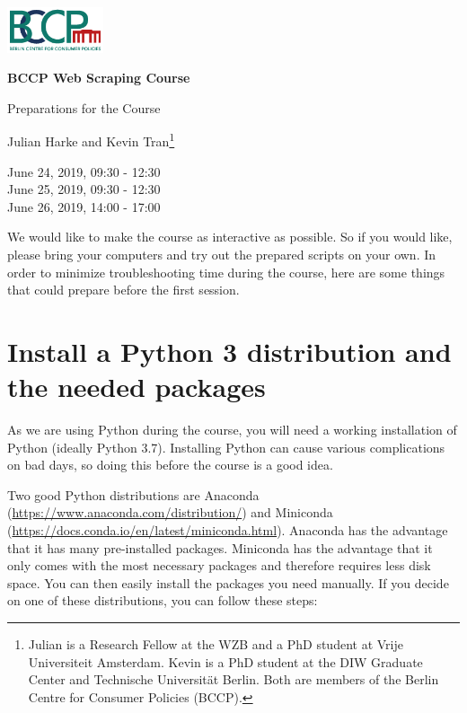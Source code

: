 \documentclass[a4paper]{article}
\begin{document}
\includegraphics[width=80pt]{../misc/bccp_logo_transparent.png}
\vspace{1cm}

\begin{center}
\textbf{\Large BCCP Web Scraping Course}

{\large Preparations for the Course}
\vspace{0.3cm}

Julian Harke and Kevin Tran\footnote{Julian is a Research Fellow at the WZB and a PhD student at Vrije Universiteit Amsterdam. Kevin is a PhD student at the DIW Graduate Center and Technische Universit\"at Berlin. Both are members of the Berlin Centre for Consumer Policies (BCCP).} \vspace{0.3cm}

June 24, 2019, 09:30 - 12:30 \\
June 25, 2019, 09:30 - 12:30 \\
June 26, 2019, 14:00 - 17:00
\end{center}

We would like to make the course as interactive as possible. So if you would like, please bring your computers and try out the prepared scripts on your own. In order to minimize troubleshooting time during the course, here are some things that could prepare before the first session.

\section{Install a Python 3 distribution and the needed packages}

As we are using Python during the course, you will need a working installation of Python (ideally Python 3.7). Installing Python can cause various complications on bad days, so doing this before the course is a good idea.

Two good Python distributions are Anaconda (\url{https://www.anaconda.com/distribution/}) and Miniconda (\url{https://docs.conda.io/en/latest/miniconda.html}). Anaconda has the advantage that it has many pre-installed packages. Miniconda has the advantage that it only comes with the most necessary packages and therefore requires less disk space. You can then easily install the packages you need manually. If you decide on one of these distributions, you can follow these steps:
\end{document}
